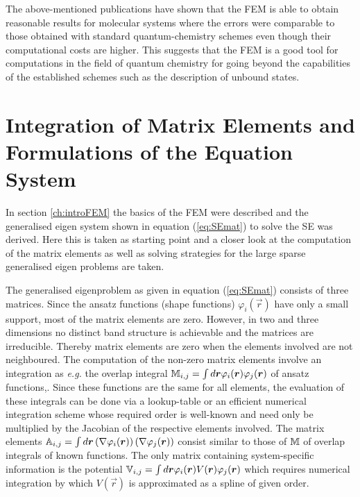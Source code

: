 The above-mentioned publications have shown that the FEM is able to obtain reasonable results for molecular systems where the errors were comparable to those obtained with standard quantum-chemistry schemes even though their computational costs are higher.
This suggests that the FEM is a good tool for computations in the field of quantum chemistry for going beyond the capabilities of the established schemes such as the description of unbound states.

\section{Integration of Matrix Elements and Formulations of the Equation System}
\label{ch:feInt}
In section \ref{ch:introFEM} the basics of the FEM were described and the generalised eigen system shown in equation (\ref{eq:SEmat}) to solve the SE was derived.
Here this is taken as starting point and a closer look at the computation of the matrix elements as well as solving strategies for the large sparse generalised eigen problems are taken.

The generalised eigenproblem as given in equation (\ref{eq:SEmat}) consists of three matrices.
Since the ansatz functions (shape functions) $\varphi_i(\vec{r})$ have only a small support, most of the matrix elements are zero. 
However, in two and three dimensions no distinct band structure is achievable and the matrices are irreducible.
Thereby matrix elements are zero when the elements involved are not neighboured.
The computation of the non-zero matrix elements involve an integration as \textit{e.g.} the overlap integral $\mathbb{M}_{i,j}=\int d \bm{r} \varphi_i(\bm{r}) \varphi_j(\bm{r})$ of ansatz functions,.
Since these functions are the same for all elements, the evaluation of these integrals can be done via a lookup-table or an efficient numerical integration scheme whose required order is well-known and need only be multiplied by the Jacobian of the respective elements involved.
The matrix elements $\mathbb{A}_{i,j}=\int d \bm{r} \left(\nabla \varphi_i(\bm{r})\right)\left(\nabla \varphi_j(\bm{r})\right)$ consist similar to those of $\mathbb{M}$ of overlap integrals of known functions.
The only matrix containing system-specific information is the potential $\mathbb{V}_{i,j}=\int d \bm{r} \varphi_i(\bm{r}) V(\bm{r}) \varphi_j(\bm{r})$ which requires numerical integration by which $V(\vec{r})$ is approximated as a spline of given order.

